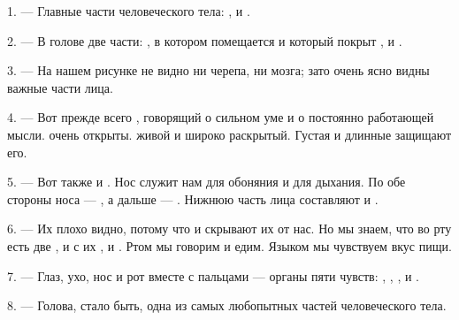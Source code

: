 
\VUsaut{4.0mm}
\VUsaut{2.0mm}

\VUsaut{2.4mm}
\VUsaut{3.0mm}

1. --- Главные части человеческого тела: , 
и .

\VUsaut{3.0mm}

2. --- В голове две части: , в котором помещается
 и который покрыт , и .

3. --- На нашем рисунке не видно ни черепа, ни мозга; зато очень ясно
видны важные части лица.

4. --- Вот прежде всего , говорящий о сильном уме и о
постоянно работающей мысли.  очень открыты. 
живой и широко раскрытый. Густая  и длинные 
защищают его.

5. --- Вот также  и . Нос служит нам для
обоняния и для дыхания. По обе стороны носа --- , а дальше ---
. Нижнюю часть лица составляют  и .

6. --- Их плохо видно, потому что  и  скрывают их
от нас. Но мы знаем, что во рту есть две ,  и  с их , и .
Ртом мы говорим и едим. Языком мы чувствуем вкус пищи.

7. --- Глаз, ухо, нос и рот вместе с пальцами --- органы пяти чувств:
, , ,  и
.

8. --- Голова, стало быть, одна из самых любопытных частей
человеческого тела.

